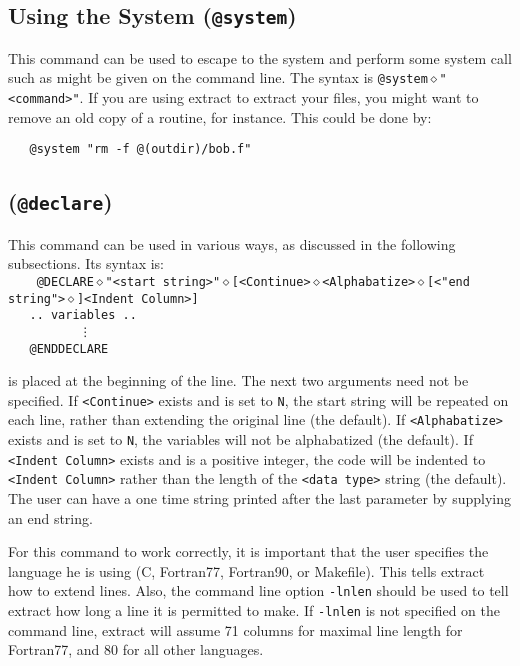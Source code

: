 \subsection{Using the System ({\tt @system})}
This command can be used to escape to the system and perform some system
call such as might be given on the command line.  The syntax is
{\tt @system$\diamond$"<command>"}.  If you are using extract to extract
your files, you might want to remove an old copy of a routine, for instance.
This could be done by:
\begin{verbatim}
   @system "rm -f @(outdir)/bob.f"
\end{verbatim}

\subsection{({\tt @declare})}
This command can be used in various ways, as discussed in the following
subsections.  Its syntax is:\\
\noindent
{\tt
\verb+   +@DECLARE$\diamond$\verb+"<start string>"+$\diamond$[<Continue>$\diamond$<Alphabatize>$\diamond$[<"end string">$\diamond$]<Indent Column>]\\
\verb+   .. variables ..+\\
\verb+         + \vdots\\
\verb+   +@ENDDECLARE\\
}

{\tt <start string>} is placed at the beginning of the line.
The next two arguments need not be specified.
If \verb+<Continue>+ exists and is set to \verb+N+, the start string will be
repeated on each line, rather than extending the original line (the default).
If \verb+<Alphabatize>+ exists and is set to \verb+N+, the variables will
not be alphabatized (the default).  If \verb+<Indent Column>+ exists and is a 
positive integer, the code will be indented to \verb+<Indent Column>+ rather
than the length of the \verb+<data type>+ string (the default).  The user can
have a one time string printed after the last parameter by supplying an
end string.

For this command to work correctly, it is important that the user specifies
the language he is using (C, Fortran77, Fortran90, or Makefile).  This tells
extract how to extend lines.  Also, the command line option {\tt -lnlen} should
be used to tell extract how long a line it is permitted to make.  If 
{\tt -lnlen} is not specified on the command line, extract will assume 71
columns for maximal line length for Fortran77, and 80 for all other languages.

